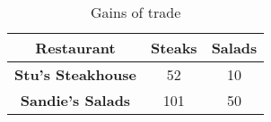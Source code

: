 \begin{table}
    \begin{tabular}{|c|c|c|}
      \hline
      \textbf{Restaurant} & \textbf{Steaks} & \textbf{Salads} \\
      \hline
      \textbf{Stu's Steakhouse} & 52 & 10 \\
      \hline
      \textbf{Sandie's Salads} & 101 & 50 \\
      \hline
    \end{tabular}
    \caption{Gains of trade}
  \end{table}